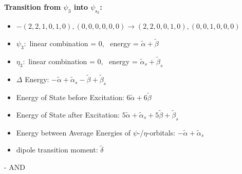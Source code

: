 \documentclass[12pt,a4paper]{article}
\begin{document}
        \noindent\textbf{Transition from $\psi_{3}$ into $\psi_{\text{s}_{3}}$:}
        \begin{itemize}
            \item $- (2, 2, 1, 0, 1, 0), (0, 0, 0, 0, 0, 0) \rightarrow (2, 2, 0, 0, 1, 0), (0, 0, 1, 0, 0, 0)$
        
            \item $\psi_{3}:$ linear combination = $0$, \
            energy = $\tilde{\alpha} + \tilde{\beta}$
            
            \item $\eta_{3}:$ linear combination = $0$, \
            energy = $\tilde{\alpha}_{s} + \tilde{\beta}_{s}$
            
                \item $\Delta$ Energy: $- \tilde{\alpha} + \tilde{\alpha}_{s} - \tilde{\beta} + \tilde{\beta}_{s}$
                \item Energy of State before Excitation: $6 \tilde{\alpha} + 6 \tilde{\beta}$
                \item Energy of State after Excitation: $5 \tilde{\alpha} + \tilde{\alpha}_{s} + 5 \tilde{\beta} + \tilde{\beta}_{s}$
                \item Energy between Average Energies of $\psi$-/$\eta$-orbitals: $- \tilde{\alpha} + \tilde{\alpha}_{s}$
            
            \item dipole transition moment: $\tilde{\delta}$
        
        \end{itemize}
        
 -  AND 
\end{document}
